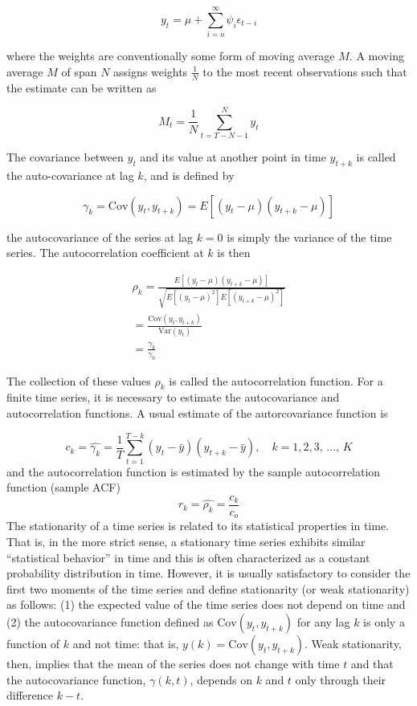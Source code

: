 \documentclass[
  11pt,
]{article}
\numberwithin{equation}{section}
\begin{document}
\[
y_{t} = \mu + \sum\limits_{i= o}^{\infty}\psi_{i}\epsilon_{t-i}
\]

where the weights are conventionally some form of moving average \(M\).
A moving average \(M\) of span \(N\) assigns weights \(\frac{1}{N}\) to
the most recent observations such that the estimate can be written as

\[
M_{t} = \frac{1}{N} \sum\limits_{t = T - N - 1}^{N} y_{t}
\]

The covariance between \(y_{t}\) and its value at another point in time
\(y_{t + k}\) is called the auto-covariance at lag \(k\), and is defined
by

\[
\gamma_{k} = \mathrm{Cov}(y_{t}, y_{t+k}) = E\left[(y_{t} - \mu)(y_{t+k} - \mu)\right]
\]

the autocovariance of the series at lag \(k = 0\) is simply the variance
of the time series. The autocorrelation coefficient at \(k\) is then

\begin{gather*}
\rho_{k} = \frac{E[(y_{t} - \mu)(y_{t+k} -\mu)]}{\sqrt{E[(y_{t} - \mu)^{2}]E[(y_{t+k} - \mu)^{2}]}} \\[8pt]
= \frac{\mathrm{Cov}(y_{t}, y_{t+k})}{\mathrm{Var}(y_{t})}\\[8pt]
= \frac{\gamma_{k}}{\gamma_{0}}
\end{gather*}

The collection of these values \(\rho_{k}\) is called the
autocorrelation function. For a finite time series, it is necessary to
estimate the autocovariance and autocorrelation functions. A usual
estimate of the autorcovariance function is

\[
c_{k} = \hat{\gamma_{k}} = \frac{1}{T} \sum\limits_{t = 1}^{T-k}(y_{t} -\bar{y})(y_{t+k} - \bar{y}), \quad k = 1, 2, 3,\, \ldots,\, K
\] and the autocorrelation function is estimated by the sample
autocorrelation function (sample ACF) \[
r_{k} = \hat{\rho_{k}} = \frac{c_{k}}{c_{o}}
\] The stationarity of a time series is related to its statistical
properties in time. That is, in the more strict sense, a stationary time
series exhibits similar ``statistical behavior'' in time and this is
often characterized as a constant probability distribution in time.
However, it is usually satisfactory to consider the first two moments of
the time series and define stationarity (or weak stationarity) as
follows: (1) the expected value of the time series does not depend on
time and (2) the autocovariance function defined as
\(\mathrm{Cov}(y_{t}, y_{t+k})\) for any lag \(k\) is only a function of
\(k\) and not time: that is, \(y(k) = \mathrm{Cov}(y_{t}, y_{t+k})\).
Weak stationarity, then, implies that the mean of the series does not
change with time \(t\) and that the autocovariance function,
\(\gamma(k, t)\), depends on \(k\) and \(t\) only through their
difference \(k - t\).
\end{document}
